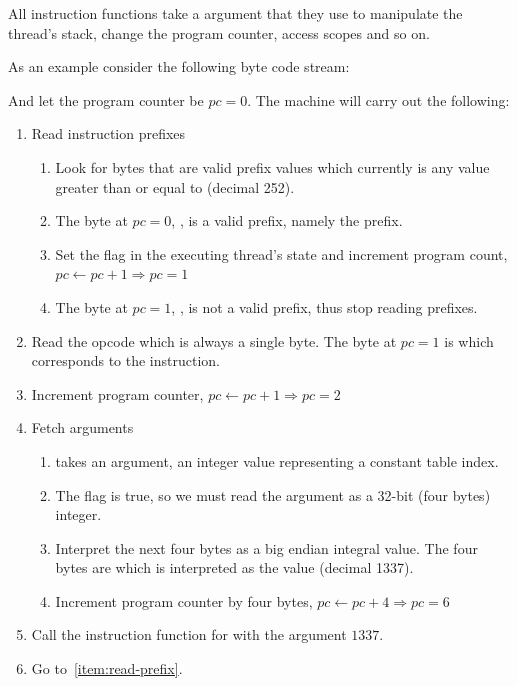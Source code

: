All instruction functions take a  argument that they use to
manipulate the thread's stack, change the program counter, access scopes and so
on.

As an example consider the following byte code stream:


And let the program counter be $pc = 0$. The machine will carry out the
following:

\begin{enumerate}
\item Read instruction prefixes
  \label{item:read-prefix}
  \begin{enumerate}
  \item Look for bytes that are valid prefix values which currently is any value
    greater than or equal to  (decimal 252).
  \item The byte at $pc=0$, , is a valid prefix, namely the
     prefix.
  \item Set the  flag in the executing thread's state and
    increment program count, $pc \leftarrow pc + 1 \Rightarrow pc= 1$
  \item The byte at $pc=1$, , is not a valid prefix, thus stop
    reading prefixes.
  \end{enumerate}

\item Read the opcode which is always a single byte. The byte at $pc=1$ is
   which corresponds to the  instruction.

\item Increment program counter, $pc \leftarrow pc + 1 \Rightarrow pc = 2$

\item Fetch arguments
  \begin{enumerate}
  \item {} takes an argument, an integer value representing a
    constant table index.
  \item The  flag is true, so we must read the argument as a
    32-bit (four bytes) integer.
  \item Interpret the next four bytes as a big endian integral value. The four
    bytes are  which is interpreted as the value
     (decimal 1337).
  \item Increment program counter by four bytes,
    $pc \leftarrow pc + 4 \Rightarrow pc = 6$
  \end{enumerate}

\item Call the instruction function for  with the argument
  $1337$.

\item Go to~\ref{item:read-prefix}.

\end{enumerate}

